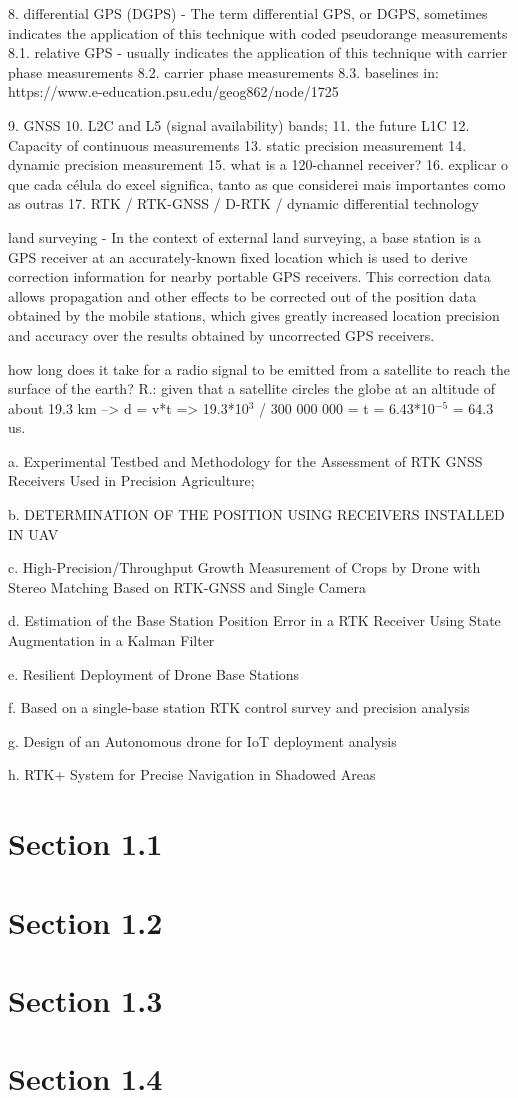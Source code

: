     8. differential GPS (DGPS) - The term differential GPS, or DGPS, sometimes indicates the application of this technique with coded pseudorange measurements
    8.1. relative GPS - usually indicates the application of this technique with carrier phase measurements
    8.2. carrier phase measurements
    8.3. baselines
    in: https://www.e-education.psu.edu/geog862/node/1725

    9. GNSS
    10. L2C and L5 (signal availability) bands;
    11. the future L1C
    12. Capacity of continuous measurements
    13. static precision measurement
    14. dynamic precision measurement
    15. what is a 120-channel receiver?
    16. explicar o que cada célula do excel significa, tanto as que considerei mais importantes como as outras
    17. RTK / RTK-GNSS / D-RTK / dynamic differential technology
        

    land surveying - In the context of external land surveying, a base station is a GPS receiver at an accurately-known fixed location which is used to derive correction information for nearby portable GPS receivers. This correction data allows propagation and other effects to be corrected out of the position data obtained by the mobile stations, which gives greatly increased location precision and accuracy over the results obtained by uncorrected GPS receivers.

    how long does it take for a radio signal to be emitted from a satellite to reach the surface of the earth? 
    R.: given that a satellite circles the globe at an altitude of about 19.3 km --> d = v*t => 19.3*10$^3$ / 300 000 000 = t = 6.43*10$^{-5}$ = 64.3 us.

a. Experimental Testbed and Methodology for the
Assessment of RTK GNSS Receivers Used
in Precision Agriculture;

b. DETERMINATION OF THE POSITION USING
RECEIVERS INSTALLED IN UAV

c. High-Precision/Throughput Growth Measurement of
Crops by Drone with Stereo Matching Based on
RTK-GNSS and Single Camera

d. Estimation of the Base Station Position Error in a
RTK Receiver Using State Augmentation in a
Kalman Filter

e. Resilient Deployment of Drone Base Stations

f. Based on a single-base station RTK control survey
and precision analysis 

g. Design of an Autonomous drone for IoT deployment
analysis 

h. RTK+ System for Precise Navigation in Shadowed
Areas 

\section{Section 1.1}\label{sub:sub1_1}

\section{Section 1.2}\label{sec:sub1_2}

\section{Section 1.3}\label{sec:sub1_3}

\section{Section 1.4}\label{sec:sub1_4}